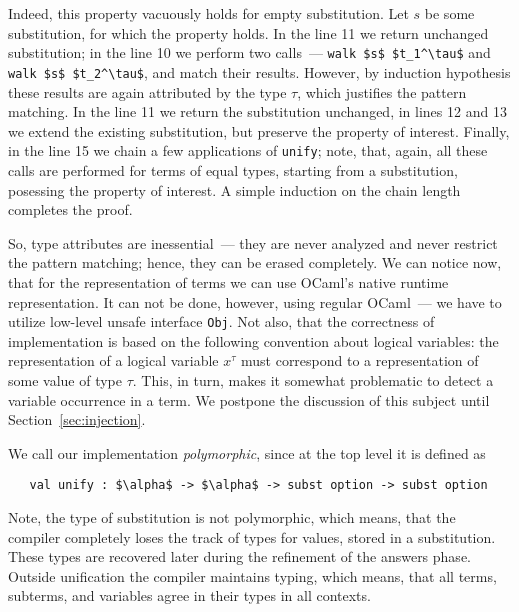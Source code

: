 Indeed, this property vacuously holds for empty substitution. Let $s$ be some substitution, for which the
property holds. In the line 11 we return unchanged substitution; in the line 10 we perform two calls~--- 
\lstinline{walk $s$ $t_1^\tau$} and \lstinline{walk $s$ $t_2^\tau$}, and match their results. However, 
by induction hypothesis these results are again attributed by the type $\tau$, which justifies the
pattern matching. In the line 11 we return the substitution unchanged, in lines 12 and 13 we extend the
existing substitution, but preserve the property of interest. Finally, in the line 15 we chain a few
applications of \lstinline{unify}; note, that, again, all these calls are performed for terms of equal 
types, starting from a substitution, posessing the property of interest. A simple induction on the
chain length completes the proof.

So, type attributes are inessential~--- they are never analyzed and never restrict the pattern matching; hence, 
they can be erased completely. We can notice now, that for the representation of terms we can use OCaml's
native runtime representation. It can not be done, however, using regular OCaml~--- we have to utilize
low-level unsafe interface \lstinline{Obj}. Not also, that the correctness of implementation is based on
the following convention about logical variables: the representation of a logical variable $x^\tau$ must
correspond to a representation of some value of type $\tau$. This, in turn, makes it somewhat problematic
to detect a variable occurrence in a term. We postpone the discussion of this subject until Section~\ref{sec:injection}.

We call our implementation \emph{polymorphic}, since at the top level it is defined as

\begin{lstlisting}
   val unify : $\alpha$ -> $\alpha$ -> subst option -> subst option
\end{lstlisting} 

Note, the type of substitution is not polymorphic, which means, that the compiler completely loses the track 
of types for values, stored in a substitution. These types are recovered later during the refinement of the answers phase.
Outside unification the compiler maintains typing, which means, that all terms, subterms, and variables agree in their types 
in all contexts. 



